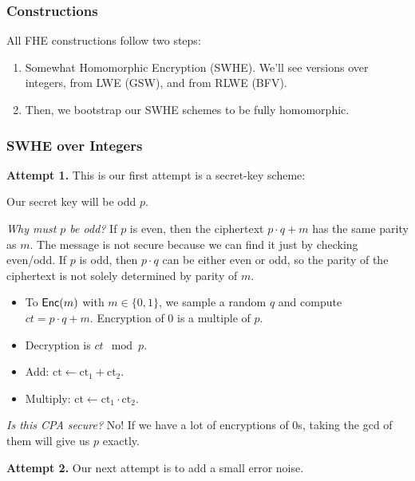 \subsubsection{Constructions}
All FHE constructions follow two steps:
\begin{enumerate}
    \item Somewhat Homomorphic Encryption (SWHE). We'll see versions over integers, from LWE (GSW), and from RLWE (BFV).
    \item Then, we bootstrap our SWHE schemes to be fully homomorphic.
\end{enumerate}

\subsubsection{SWHE over Integers}\label{sec:apr06-swhe-integers}
\textbf{Attempt 1.} This is our first attempt is a secret-key scheme:

Our secret key will be odd $p$.

\begin{remark}
    \textit{Why must $p$ be odd?} If $p$ is even, then the ciphertext $p\cdot q + m$ has the same parity as $m$. The message is not secure because we can find it just by checking even/odd. If $p$ is odd, then $p\cdot q$ can be either even or odd, so the parity of the ciphertext is not solely determined by parity of $m$.
\end{remark}

\begin{itemize}
    \item To $\operatorname{\mathsf{Enc}}(m)$ with $m\in \{0, 1\}$, we sample a random $q$ and compute $ct = p\cdot q + m$. Encryption of $0$ is a multiple of $p$.
    \item Decryption is $ct\mod p$.
    \item Add: $\text{ct} \gets \text{ct}_1 + \text{ct}_2$.
    \item Multiply: $\text{ct} \gets \text{ct}_1 \cdot \text{ct}_2 $.
\end{itemize}

\emph{Is this CPA secure?} No! If we have a lot of encryptions of $0$s, taking the gcd of them will give us $p$ exactly.

\textbf{Attempt 2.} Our next attempt is to add a small error noise.

